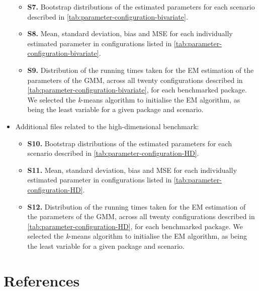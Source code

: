 \begin{itemize}
  \begin{itemize}
  \item
    \textbf{S7.} Bootstrap distributions of the estimated parameters for each
    scenario described in \ref{tab:parameter-configuration-bivariate}.
  \item
    \textbf{S8.} Mean, standard deviation, bias and MSE for each individually
    estimated parameter in configurations listed in \ref{tab:parameter-configuration-bivariate}.
  \item
    \textbf{S9.} Distribution of the running times taken for the EM estimation of the parameters of the GMM, across all twenty configurations described in \ref{tab:parameter-configuration-bivariate}, for each benchmarked package. We selected the \emph{k}-means algorithm to initialise the EM algorithm, as being the least variable for a given package and scenario.
  \end{itemize}
\item
  Additional files related to the high-dimensional benchmark:

  \begin{itemize}
  \item
    \textbf{S10.} Bootstrap distributions of the estimated parameters for each
    scenario described in \ref{tab:parameter-configuration-HD}.
  \item
    \textbf{S11.} Mean, standard deviation, bias and MSE for each individually
    estimated parameter in configurations listed in \ref{tab:parameter-configuration-HD}.
  \item
    \textbf{S12.} Distribution of the running times taken for the EM estimation of the parameters of the GMM, across all twenty configurations described in \ref{tab:parameter-configuration-HD}, for each benchmarked package. We selected the \emph{k}-means algorithm to initialise the EM algorithm, as being the least variable for a given package and scenario.
  \end{itemize}
\end{itemize}

\hypertarget{references}{%
\section{References}\label{references}}



\address{%
Bastien Chassagnol\\
Laboratoire de Probabilités, Statistiques et Modélisation (LPSM), UMR CNRS 8001\\%
4 Place Jussieu Sorbonne Université\\ 75005, Paris, France\\
%
%
\textit{ORCiD: \href{https://orcid.org/0000-0002-8955-2391}{0000-0002-8955-2391}}\\%
\href{mailto:bastien_chassagnol@laposte.net}{\nolinkurl{bastien\_chassagnol@laposte.net}}%
}

